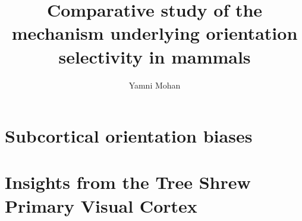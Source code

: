 \documentclass [12pt]{report}
\title{Comparative study of the mechanism underlying orientation selectivity in mammals}
\author{Yamni Mohan}
\date{}
\begin{document}
	\maketitle
	\tableofcontents
	
	
	
%	
	
	\part{Subcortical orientation biases}
	
	
	\part{Insights from the Tree Shrew Primary Visual Cortex}
	
%	
%	
 


\end{document}
